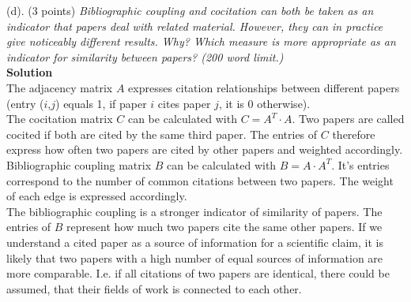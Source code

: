 (d). (3 points) \textsl{Bibliographic coupling and cocitation can both be taken as an indicator that papers deal with related material. However, they can in practice give noticeably different results. Why? Which measure is more appropriate as an indicator for similarity between papers? (200 word limit.) }\\

\textbf{Solution}\\
The adjacency matrix $A$ expresses citation relationships between different papers (entry ($i$,$j$) equals 1, if paper $i$ cites paper $j$, it is 0 otherwise).\\

The cocitation matrix $C$ can be calculated with $C = A^T \cdot A$. Two papers are called cocited if both are cited by the same third paper. The entries of $C$ therefore express how often two papers are cited by other papers and weighted accordingly.\\

Bibliographic coupling matrix $B$ can be calculated with $B = A \cdot A^T$. It's entries correspond to the number of common citations between two papers. The weight of each edge is expressed accordingly.\\

The bibliographic coupling is a stronger indicator of similarity of papers. The entries of $B$ represent how much two papers cite the same other papers. If we understand a cited paper as a source of information for a scientific claim, it is likely that two papers with a high number of equal sources of information are more comparable. I.e. if all citations of two papers are identical, there could be assumed, that their fields of work is connected to each other.\\

